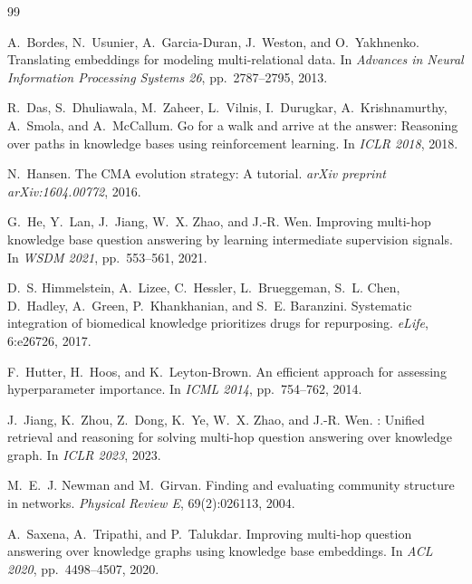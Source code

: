 \documentclass[11pt,a4paper]{article}
\begin{document}

\begin{thebibliography}{99}

A.~Bordes, N.~Usunier, A.~Garcia-Duran, J.~Weston, and O.~Yakhnenko.
\newblock Translating embeddings for modeling multi-relational data.
\newblock In \emph{Advances in Neural Information Processing Systems 26},
  pp.~2787--2795, 2013.

R.~Das, S.~Dhuliawala, M.~Zaheer, L.~Vilnis, I.~Durugkar, A.~Krishnamurthy,
  A.~Smola, and A.~McCallum.
\newblock Go for a walk and arrive at the answer: Reasoning over paths in
  knowledge bases using reinforcement learning.
\newblock In \emph{ICLR 2018}, 2018.

N.~Hansen.
\newblock The CMA evolution strategy: A tutorial.
\newblock \emph{arXiv preprint arXiv:1604.00772}, 2016.

G.~He, Y.~Lan, J.~Jiang, W.~X. Zhao, and J.-R. Wen.
\newblock Improving multi-hop knowledge base question answering by learning
  intermediate supervision signals.
\newblock In \emph{WSDM 2021}, pp.~553--561, 2021.

D.~S. Himmelstein, A.~Lizee, C.~Hessler, L.~Brueggeman, S.~L. Chen,
  D.~Hadley, A.~Green, P.~Khankhanian, and S.~E. Baranzini.
\newblock Systematic integration of biomedical knowledge prioritizes drugs for
  repurposing.
\newblock \emph{eLife}, 6:e26726, 2017.

F.~Hutter, H.~Hoos, and K.~Leyton-Brown.
\newblock An efficient approach for assessing hyperparameter importance.
\newblock In \emph{ICML 2014}, pp.~754--762, 2014.

J.~Jiang, K.~Zhou, Z.~Dong, K.~Ye, W.~X. Zhao, and J.-R. Wen.
: Unified retrieval and reasoning for solving multi-hop
  question answering over knowledge graph.
\newblock In \emph{ICLR 2023}, 2023.

M.~E.~J. Newman and M.~Girvan.
\newblock Finding and evaluating community structure in networks.
\newblock \emph{Physical Review E}, 69(2):026113, 2004.

A.~Saxena, A.~Tripathi, and P.~Talukdar.
\newblock Improving multi-hop question answering over knowledge graphs using
  knowledge base embeddings.
\newblock In \emph{ACL 2020}, pp.~4498--4507, 2020.


\end{thebibliography}
\end{document}
